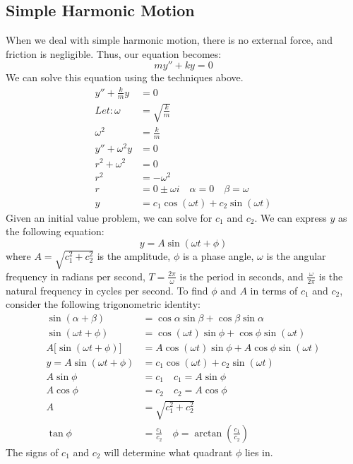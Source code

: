 \documentclass{math}
\begin{document}
\subsection*{Simple Harmonic Motion}
When we deal with simple harmonic motion, there is no external force, and
friction is negligible. Thus, our equation becomes:
\[ my''+ky = 0 \]
We can solve this equation using the techniques above.
\begin{align*}
  y''+\frac{k}{m}y &= 0 \\
  Let: \omega &= \sqrt{\frac{k}{m}} \\
  \omega^2 &= \frac{k}{m} \\
  y''+\omega^2y &= 0 \\
  r^2+\omega^2 &= 0 \\
  r^2 &= -\omega^2 \\
  r &= 0\pm\omega i \quad \alpha = 0 \quad \beta = \omega \\
  y &= c_1\cos(\omega t)+c_2\sin(\omega t)
\end{align*}
Given an initial value problem, we can solve for \( c_1 \) and \( c_2 \). We can
express \( y \) as the following equation:
\[ y = A\sin(\omega t+\phi) \]
where \( A = \sqrt{c_1^2+c_2^2} \) is the amplitude, \( \phi \) is a phase
angle, \( \omega \) is the angular frequency in radians per second, \( T =
\frac{2\pi}{\omega} \) is the period in seconds, and \( \frac{\omega}{2\pi} \)
is the natural frequency in cycles per second. To find \( \phi \) and \( A \)
in terms of \( c_1 \) and \( c_2 \), consider the following trigonometric
identity:
\begin{align*}
  \sin(\alpha+\beta) &= \cos\alpha\sin\beta+\cos\beta\sin\alpha \\
  \sin(\omega t+\phi) &= \cos(\omega t)\sin\phi+\cos\phi\sin(\omega t) \\
  A\bigg[\sin(\omega t+\phi)\bigg] &=
    A\cos(\omega t)\sin\phi+A\cos\phi\sin(\omega t) \\
  y = A\sin(\omega t+\phi) &= c_1\cos(\omega t)+c_2\sin(\omega t) \\
  A\sin\phi &= c_1 \quad c_1 = A\sin\phi \\
  A\cos\phi &= c_2 \quad c_2 = A\cos\phi \\
  A &= \sqrt{c_1^2+c_2^2} \\
  \tan\phi &= \frac{c_1}{c_2} \quad \phi = \arctan(\frac{c_1}{c_2})
\end{align*}
The signs of \( c_1 \) and \( c_2 \) will determine what quadrant \( \phi \)
lies in.
\end{document}
